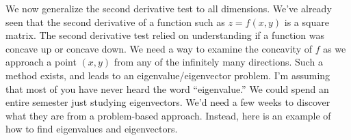 
We now generalize the second derivative test to all dimensions. We've already seen that the second derivative of a function such as $z=f(x,y)$ is a square matrix. The second derivative test relied on understanding if a function was concave up or concave down. We need a way to examine the concavity of $f$ as we approach a point $(x,y)$ from any of the infinitely many directions. Such a method exists, and leads to an eigenvalue/eigenvector problem. I'm assuming that most of you have never heard the word ``eigenvalue.'' We could spend an entire semester just studying eigenvectors. We'd need a few weeks to discover what they are from a problem-based approach.  Instead, here is an example of how to find eigenvalues and eigenvectors.


